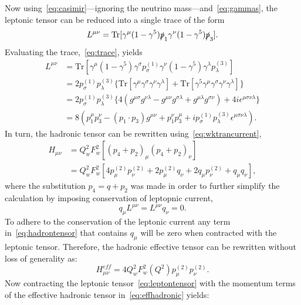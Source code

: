 Now using~\eqref{eq:casimir}---ignoring the neutrino mass---and~\eqref{eq:gammas}, the leptonic tensor can be reduced into a single trace of the form
\begin{equation}\label{eq:trace}
L^{\mu \nu}= \mathrm{Tr}[\gamma ^{\mu}(1-\gamma ^5) \slashed{p}_1\gamma ^{\nu}(1-\gamma ^5)\slashed{p}_3].
\end{equation}
Evaluating the trace,~\eqref{eq:trace}, yields
\begin{align}
L^{\mu \nu} &= \mathrm{Tr}[\gamma ^{\mu}(1-\gamma ^5) \gamma ^{\sigma} p_{\sigma}^{(1)}\gamma ^{\nu}(1-\gamma ^5)\gamma ^{\lambda} p_{\lambda}^{(3)}] \nonumber 
\\
&= 2 p_{\sigma}^{(1)} p_{\lambda}^{(3)}\{ \mathrm{Tr}[\gamma ^{\mu}\gamma ^{\sigma}\gamma ^{\nu}\gamma ^{\lambda}]+\mathrm{Tr}[\gamma ^5 \gamma ^{\mu}\gamma ^{\sigma}\gamma ^{\nu}\gamma ^{\lambda}]\} \nonumber
\\
&= 2 p_{\sigma}^{(1)} p_{\lambda}^{(3)}\{ 4(g^{\mu \sigma}g^{\nu \lambda} - g^{\mu \nu}g^{\sigma \lambda} + g^{\mu \lambda}g^{\sigma \nu})+4i\epsilon^{\mu \sigma \nu \lambda}\}\nonumber
\\
&= 8 \left( p_1^{\mu}p_3^{\nu}-(p_1\cdot p_3) g^{\mu \nu}+p_1^{\nu}p_3^{\mu} +i p_{\sigma}^{(1)} p_{\lambda}^{(3)} \epsilon ^{\mu \sigma \nu \lambda} \right). \label{eq:leptontensor}
\end{align}
In turn, the hadronic tensor can be rewritten using~\eqref{eq:wktrancurrent},
\begin{align}
H_{\mu \nu} &= Q_{w}^2 F_{w}^2[(p_4+p_2)_{\mu}(p_4+p_2)_{\nu}] \nonumber \\
&= Q_{w}^2 F_{w}^2[4p_{\mu}^{(2)}p_{\nu}^{(2)}+2p_{\mu}^{(2)}q_{\nu}+2q_{\mu}p_{\nu}^{(2)} +q_{\mu}q_{\nu}],\label{eq:hadrontensor}
\end{align}
where the substitution $p_4=q+p_2$ was made in order to further simplify the calculation by imposing conservation of leptopnic current,
\begin{equation}
q_{\mu}L^{\mu \nu} = L^{\mu \nu}q_{\nu}=0.
\end{equation}
To adhere to the conservation of the leptonic current any term in~\eqref{eq:hadrontensor} that contains $q_{\mu}$ will be zero when contracted with the leptonic tensor. Therefore, the hadronic effective tensor can be rewritten without loss of generality as:
\begin{equation}\label{eq:effhadronic}
H_{\mu \nu}^{eff}=4Q_{w}^2 F_{w}^2(Q^2) p_{\mu}^{(2)}p_{\nu}^{(2)}.
\end{equation}
Now contracting the leptonic tensor~\eqref{eq:leptontensor} with the momentum terms of the effective hadronic tensor in~\eqref{eq:effhadronic} yields:
